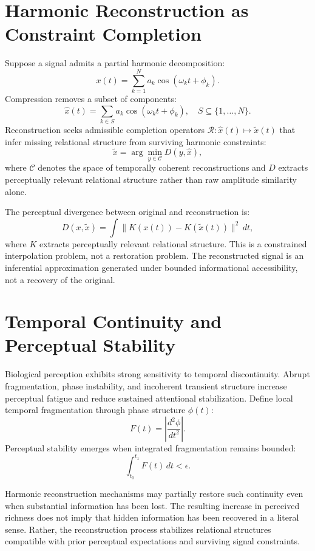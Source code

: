 \section{Harmonic Reconstruction as Constraint Completion}

Suppose a signal admits a partial harmonic decomposition:
\[
  x(t) = \sum_{k=1}^{N} a_k \cos(\omega_k t + \phi_k).
\]
Compression removes a subset of components:
\[
  \hat{x}(t) = \sum_{k \in S} a_k \cos(\omega_k t + \phi_k), \quad S \subseteq \{1,\ldots,N\}.
\]
Reconstruction seeks admissible completion operators $\mathcal{R}: \hat{x}(t) \mapsto
\tilde{x}(t)$ that infer missing relational structure from surviving harmonic
constraints:
\[
  \tilde{x} = \arg\min_{y \in \mathcal{C}} D(y, \hat{x}),
\]
where $\mathcal{C}$ denotes the space of temporally coherent reconstructions and
$D$ extracts perceptually relevant relational structure rather than raw amplitude
similarity alone.

The perceptual divergence between original and reconstruction is:
\[
  D(x, \tilde{x}) = \int \|K(x(t)) - K(\tilde{x}(t))\|^2\, dt,
\]
where $K$ extracts perceptually relevant relational structure. This is a
constrained interpolation problem, not a restoration problem. The reconstructed
signal is an inferential approximation generated under bounded informational
accessibility, not a recovery of the original.

\section{Temporal Continuity and Perceptual Stability}

Biological perception exhibits strong sensitivity to temporal discontinuity.
Abrupt fragmentation, phase instability, and incoherent transient structure
increase perceptual fatigue and reduce sustained attentional stabilization.
Define local temporal fragmentation through phase structure $\phi(t)$:
\[
  F(t) = \left|\frac{d^2\phi}{dt^2}\right|.
\]
Perceptual stability emerges when integrated fragmentation remains bounded:
\[
  \int_{t_0}^{t_1} F(t)\,dt < \epsilon.
\]

\claimH Harmonic reconstruction mechanisms may partially restore such continuity
even when substantial information has been lost. The resulting increase in perceived
richness does not imply that hidden information has been recovered in a literal
sense. Rather, the reconstruction process stabilizes relational structures
compatible with prior perceptual expectations and surviving signal constraints.

